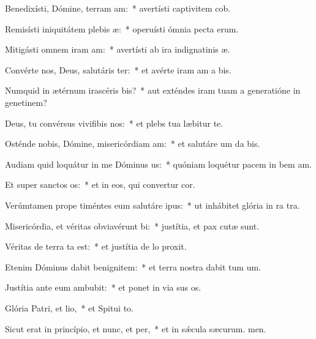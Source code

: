 \item Benedixísti, Dómine, terram am:~* avertísti captivitem cob.
\item Remisísti iniquitátem plebis æ:~* operuísti ómnia pecta erum.
\item Mitigásti omnem iram am:~* avertísti ab ira indignatinis æ.
\item Convérte nos, Deus, salutáris ter:~* et avérte iram am a bis.
\item Numquid in ætérnum irascéris bis?~* aut exténdes iram tuam a generatióne in genetinem?
\item Deus, tu convérsus vivifibis nos:~* et plebs tua læbitur  te.
\item Osténde nobis, Dómine, misericórdiam am:~* et salutáre um da bis.
\item Audiam quid loquátur in me Dóminus us:~* quóniam loquétur pacem in bem am.
\item Et super sanctos os:~* et in eos, qui convertur  cor.
\item Verúmtamen prope timéntes eum salutáre ipus:~* ut inhábitet glória in ra tra.
\item Misericórdia, et véritas obviavérunt bi:~* justítia, et pax cutæ sunt.
\item Véritas de terra ta est:~* et justítia de lo proxit.
\item Etenim Dóminus dabit benignitem:~* et terra nostra dabit tum um.
\item Justítia ante eum ambubit:~* et ponet in via sus os.
\item Glória Patri, et lio,~* et Spitui to.
\item Sicut erat in princípio, et nunc, et per,~* et in sǽcula sæcurum. men.
